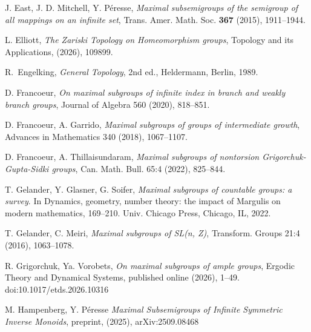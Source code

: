 \documentclass[11pt]{amsart}
\theoremstyle{definition}
\begin{document}
\begin{thebibliography}{}
J. East, J. D. Mitchell, Y. P\'eresse, {\em Maximal subsemigroups of the semigroup of all mappings on an infinite set}, Trans. Amer. Math. Soc. {\bf 367} (2015), 1911--1944. 

  L. Elliott, {\em The Zariski Topology on Homeomorphism groups}, 
  Topology and its Applications,
  (2026), 109899.





R.~Engelking, {\em General Topology}, 2nd ed., Heldermann,
Berlin, 1989.

D. Francoeur, {\em On maximal subgroups of infinite index in branch and weakly branch
groups}, Journal of Algebra 560 (2020), 818--851.

 D. Francoeur, A. Garrido, {\em Maximal subgroups of groups of intermediate growth},
Advances in Mathematics 340 (2018), 1067--1107.


D. Francoeur, A. Thillaisundaram, {\em Maximal subgroups of nontorsion Grigorchuk-Gupta-Sidki groups}, Can. Math. Bull. 65:4 (2022),  825--844.


T. Gelander, Y. Glasner, G. Soifer, {\em Maximal subgroups of countable groups: a survey}. In Dynamics, geometry, number theory: the impact of Margulis on modern
mathematics, 169--210. Univ. Chicago Press, Chicago, IL, 2022.

T. Gelander, C. Meiri, {\em Maximal subgroups of SL(n, Z)}, Transform. Groups 21:4 (2016), 1063--1078.

R. Grigorchuk, Ya. Vorobets, {\em On maximal subgroups of ample groups},
Ergodic Theory and Dynamical Systems, published online (2026), 1--49. doi:10.1017/etds.2026.10316

M. Hampenberg, Y. Péresse
      \emph{Maximal Subsemigroups of Infinite Symmetric Inverse Monoids}, preprint, (2025), arXiv:2509.08468



\end{thebibliography}
\end{document}
